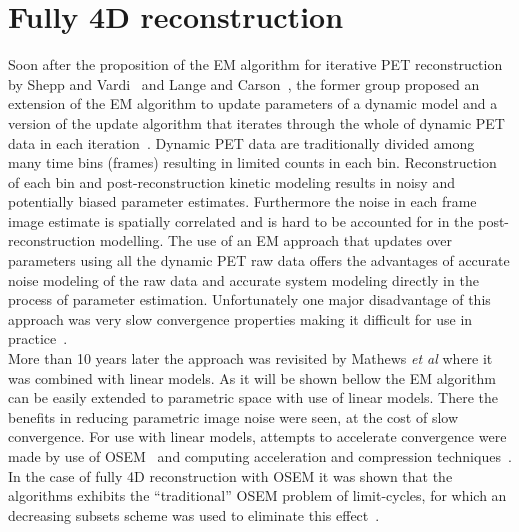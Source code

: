 \section{Fully 4D reconstruction}
\label{section:Fully_4D_reconstruction}
Soon after the proposition of the EM algorithm for iterative PET reconstruction by Shepp and Vardi~\cite{Vardi1985} and Lange and Carson~\cite{Lange1984}, the former group proposed an extension of the EM algorithm to update parameters of a dynamic model and a version of the update algorithm that iterates through the whole of dynamic PET data in each iteration~\cite{Carson1985}. Dynamic PET data are traditionally divided among many time bins (frames) resulting in limited counts in each bin. Reconstruction of each bin and post-reconstruction kinetic modeling results in noisy and potentially biased parameter estimates. Furthermore the noise in each frame image estimate is spatially correlated and is hard to be accounted for in the post-reconstruction modelling. The use of an EM approach that updates over parameters using all the dynamic PET raw data offers the advantages of accurate noise modeling of the raw data and accurate system modeling directly in the process of parameter estimation. Unfortunately one major disadvantage of this approach was very slow convergence properties making it difficult for use in practice~\cite{Carson1985}. \\
More than 10 years later the approach was revisited by Mathews \textit{et al}\cite{Matthews1995} where it was combined with linear models. As it will be shown bellow the EM algorithm can be easily extended to parametric space with use of linear models. There the benefits in reducing parametric image noise were seen, at the cost of slow convergence. For use with linear models, attempts to accelerate convergence were made by use of OSEM~\cite{Tsoumpas2008} and computing acceleration and compression techniques~\cite{Hong2008}. In the case of fully 4D reconstruction with OSEM it was shown that the algorithms exhibits the “traditional” OSEM problem of limit-cycles, for which an decreasing subsets scheme was used to eliminate this effect~\cite{Angelis2011}. \\
